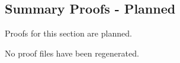 \subsection*{Summary Proofs - Planned}

Proofs for this section are planned.

No proof files have been regenerated.
